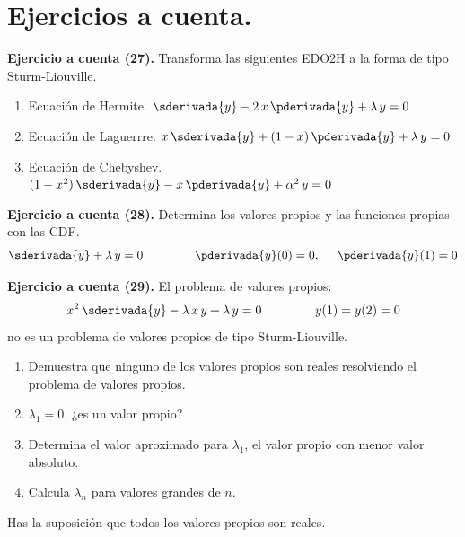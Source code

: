 \section{Ejercicios a cuenta.}


\textbf{Ejercicio a cuenta (27). }  Transforma las siguientes EDO2H a la forma de tipo Sturm-Liouville.
\begin{enumerate}[label=\roman*)]
\item Ecuación de Hermite. \hspace{1cm} $\sderivada{y} - 2 \, x \, \pderivada{y} + \lambda \, y = 0$
\item Ecuación de Laguerrre. \hspace{0.75cm} $x\, \sderivada{y} + (1 - x) \, \pderivada{y} + \lambda \, y = 0$
\item Ecuación de Chebyshev. \hspace{0.5cm} $(1 - x^{2}) \, \sderivada{y} - x \, \pderivada{y} + \alpha^{2} \, y = 0$
\end{enumerate}

\textbf{Ejercicio a cuenta (28). } Determina los valores propios y las funciones propias con las CDF.
\begin{align*}
\sderivada{y} + \lambda \, y = 0 \hspace{1.5cm} \pderivada{y}(0) = 0, \hspace{0.5cm} \pderivada{y}(1) = 0
\end{align*}

\textbf{Ejercicio a cuenta (29). } El problema de valores propios:
\begin{align*}
x^{2} \, \sderivada{y} - \lambda \, x \, y + \lambda \, y = 0 \hspace{1.5cm} y(1) = y(2) = 0
\end{align*}
no es un problema de valores propios de tipo Sturm-Liouville.
\begin{enumerate}[label=\roman*)]
\item Demuestra que ninguno de los valores propios son reales resolviendo el problema de valores propios.
\item $\lambda_{1} = 0$, ¿es un valor propio?
\item Determina el valor aproximado para $\lambda_{1}$, el valor propio con menor valor absoluto.
\item Calcula $\lambda_{n}$ para valores grandes de $n$.
\end{enumerate}
Has la suposición que todos los valores propios son reales.
